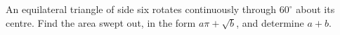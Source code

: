 An equilateral triangle of side six rotates continuously through $60^\circ$ about its centre. Find the area swept out, in the form $a\pi+\sqrt b$, and determine $a+b$.
